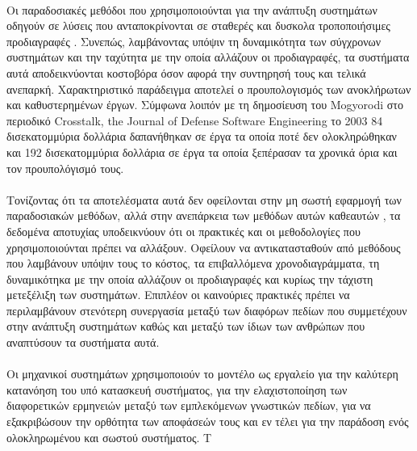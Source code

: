 \documentclass[a4paper,12pt,twoside]{report}
\begin{document}
{			\paragraph{} {Οι παραδοσιακές μεθόδοι που χρησιμοποιούνται για την ανάπτυξη συστημάτων οδηγούν σε λύσεις που ανταποκρίνονται σε σταθερές και δυσκολα τροποποιήσιμες προδιαγραφές . Συνεπώς, λαμβάνοντας υπόψιν τη δυναμικότητα των σύγχρονων συστημάτων και την ταχύτητα με την οποία αλλάζουν οι προδιαγραφές, τα συστήματα αυτά αποδεικνύονται κοστοβόρα όσον αφορά την συντηρησή τους και τελικά ανεπαρκή. Χαρακτηριστικό παράδειγμα αποτελεί ο προυπολογισμός των ανοκλήρωτων και καθυστερημένων έργων. Σύμφωνα λοιπόν με τη δημοσίευση του Mogyorodi στο περιοδικό Crosstalk, the Journal of Defense Software Engineering το 2003 \cite{JournalDefenseMogyorodi} 84 δισεκατομμύρια δολλάρια δαπανήθηκαν σε έργα τα οποία ποτέ δεν ολοκληρώθηκαν και 192 δισεκατομμύρια δολλάρια σε έργα τα οποία ξεπέρασαν τα χρονικά όρια και τον προυπολόγισμό τους.
			}
			\paragraph{} {Τονίζοντας ότι τα αποτελέσματα αυτά δεν οφείλονται στην μη σωστή εφαρμογή των παραδοσιακών μεθόδων, αλλά στην ανεπάρκεια των μεθόδων αυτών καθεαυτών \cite{MDSysDevelIBM}, τα δεδομένα αποτυχίας υποδεικνύουν ότι οι πρακτικές και οι μεθοδολογίες που χρησιμοποιούνται πρέπει να αλλάξουν. Οφείλουν να αντικατασταθούν από μεθόδους που λαμβάνουν υπόψιν τους το κόστος, τα επιβαλλόμενα χρονοδιαγράμματα, τη δυναμικότηκα με την οποία αλλάζουν οι προδιαγραφές και κυρίως την τάχιστη μετεξέλιξη των συστημάτων. Επιπλέον οι καινούριες πρακτικές πρέπει να περιλαμβάνουν στενότερη συνεργασία μεταξύ των διαφόρων πεδίων που συμμετέχουν στην ανάπτυξη συστημάτων καθώς και μεταξύ των ίδιων των ανθρώπων που αναπτύσουν τα συστήματα αυτά. 
			}
			
			\paragraph{} {Οι μηχανικοί συστημάτων χρησιμοποιούν το μοντέλο ως εργαλείο για την καλύτερη κατανόηση του υπό κατασκευή συστήματος, για την ελαχιστοποίηση των διαφορετικών ερμηνειών μεταξύ των εμπλεκόμενων γνωστικών πεδίων, για να εξακριβώσουν την ορθότητα των αποφάσεών τους και εν τέλει για την παράδοση ενός ολοκληρωμένου και σωστού συστήματος. Τ
			}
			
			\paragraph{} {\cite{IntegratedApproachMBMechatronicDesign}}
			
}
\end{document}
